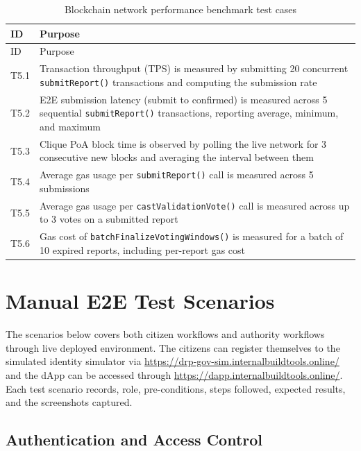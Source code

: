 \begin{longtable}{p{}|p{}}
\caption{Blockchain network performance benchmark test cases} \\

  {ID} &   {Purpose} \\
\hline
\endfirsthead
\hline
  {ID} &   {Purpose} \\
\hline
\endhead
T5.1 & Transaction throughput (TPS) is measured by submitting 20 concurrent \texttt{submitReport()} transactions and computing the submission rate \\
\hline
T5.2 & \ac{E2E} submission latency (submit to confirmed) is measured across 5 sequential \texttt{submitReport()} transactions, reporting average, minimum, and maximum \\
\hline
T5.3 & Clique PoA block time is observed by polling the live network for 3 consecutive new blocks and averaging the interval between them \\
\hline
T5.4 & Average gas usage per \texttt{submitReport()} call is measured across 5 submissions \\
\hline
T5.5 & Average gas usage per \texttt{castValidationVote()} call is measured across up to 3 votes on a submitted report \\
\hline
T5.6 & Gas cost of \texttt{batchFinalizeVotingWindows()} is measured for a batch of 10 expired reports, including per-report gas cost \\

\end{longtable}

\section{Manual \ac{E2E} Test Scenarios}
\label{sec:manual-e2e}

The scenarios below covers both citizen workflows and authority workflows through live deployed environment. The citizens can register themselves to the simulated identity simulator via \href{https://drp-gov-sim.internalbuildtools.online/}{https://drp-gov-sim.internalbuildtools.online/} and the dApp can be accessed through \href{https://dapp.internalbuildtools.online/} {https://dapp.internalbuildtools.online/}. Each test scenario records, role, pre-conditions, steps followed, expected results, and the screenshots captured. 


\subsection{Authentication and Access Control}


